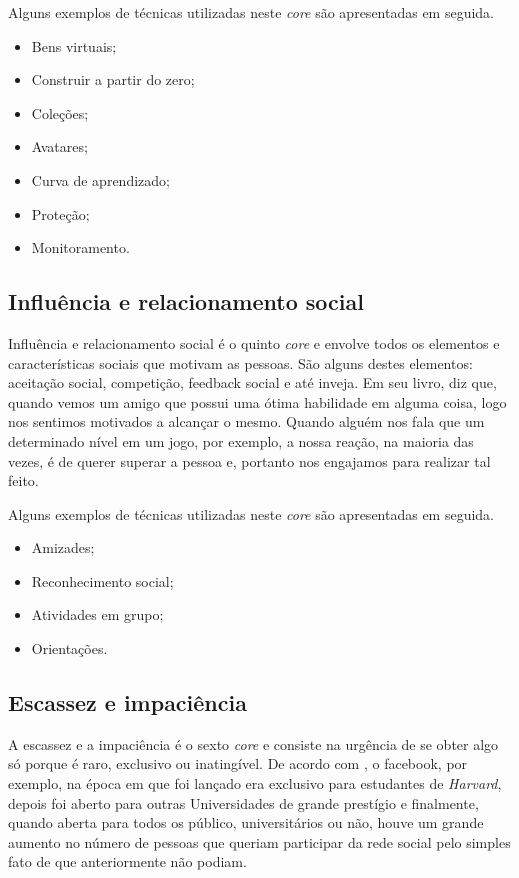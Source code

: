 Alguns exemplos de técnicas utilizadas neste \textit{core} são apresentadas em seguida.

\begin{itemize}
	\item Bens virtuais;
	\item Construir a partir do zero;
	\item Coleções;
	\item Avatares;
	\item Curva de aprendizado;
	\item Proteção;
	\item Monitoramento.
\end{itemize}


\subsection{Influência e relacionamento social}
Influência e relacionamento social é o quinto \textit{core} e envolve todos os elementos e características sociais que 
motivam as pessoas. São alguns destes elementos: aceitação social, competição, feedback social e até inveja. Em seu livro,
 diz que, quando vemos um amigo que possui uma ótima habilidade em alguma coisa, logo nos sentimos
motivados a alcançar o mesmo. Quando alguém nos fala que um determinado nível em um jogo, por exemplo, a nossa reação, na maioria das 
vezes, é de querer superar a pessoa e, portanto nos engajamos para realizar tal feito.

Alguns exemplos de técnicas utilizadas neste \textit{core} são apresentadas em seguida.

\begin{itemize}
	\item Amizades;
	\item Reconhecimento social;
	\item Atividades em grupo;
	\item Orientações.
\end{itemize}


\subsection{Escassez e impaciência}
A escassez e a impaciência é o sexto \textit{core} e consiste na urgência de se obter algo só porque é raro, exclusivo ou inatingível. De 
acordo com , o facebook, por exemplo, na época em que foi lançado era exclusivo para estudantes de \textit{Harvard}, 
depois foi aberto para outras Universidades de grande prestígio e finalmente, quando aberta para todos os público, universitários ou não, 
houve um grande aumento no número de pessoas que queriam participar da rede social pelo simples fato de que anteriormente não podiam.

